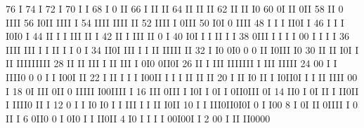 \begin{Listing}
       76                                    I
       74                                    I
       72                                    I
       70                                    I  I
       68                                I   0 II
       66                                I  II II
       64                                II II II
       62                                II II I0
       60                                0I II 0II
       58                                II 0 IIII
       56                                I0II IIII I
       54                                IIII IIII II
       52                                IIII I  0III
       50                                 I0I 0  IIII
       48                             I    I  I  II0I                                I
       46                             I    I  I  I0I0                                I
       44                            II    I  I   III                             II I
       42                            II    I      III                             II 0   I
       40                            I0I          I I                             II I   I
       38                            0III            I I                 I      I 00 I I I    I
       36                            IIII            III                 I      I II I I 0    I
       34                            II0I            III                 I      I II  IIIII  II
       32                            I I0            0I0                 0      0 II  I0III  I0
       30                          II  II            I0I                 I     II     IIIIIIIII
       28                          II  II            III                 I  II III  I 0I0 0II0I
       26                          II   I            III                   IIIIIII  I III IIIII
       24                          00                    I          I      IIII0 0  0 I I I00I      II
       22                        I II                    I          I   I  I00II I  I   I  II   II  II
       20                        I II                   I0          II  I I0II0I I  I      II  IIII 00 I
       18                        0I                     III         0II 0 IIIII                I00IIII I
       16                       III                     0III  I     I0I I 0I  I                0II0III 0I
       14                       II0                     I 0I II I   II0II I                    IIII0   II I
       12                       0 I                     I I0 I0 I I  III  I                    I  II   I0II
       10                     I I                         III0II0I0I   0                              I I00
        8                   I 0I                            II 0IIII   I                              0  II  I
        6                   0II0                            0  I 0I0                                  I  I II0II
        4                   I0 I                            I    I I                                       00I00I I
        2                 00 I                                                                             II II0000
 

\end{Listing}
